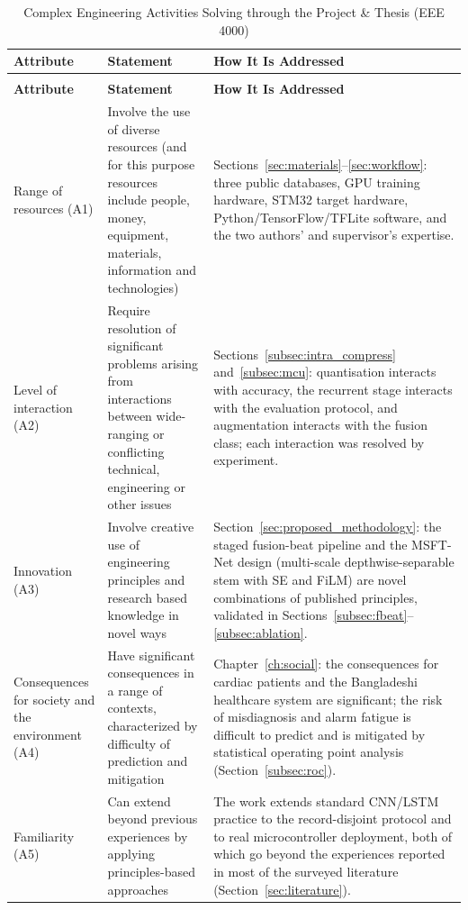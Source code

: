 \begin{longtable}{@{}>{\raggedright\arraybackslash}p{1.4in}>{\raggedright\arraybackslash}p{2.4in}>{\raggedright\arraybackslash}p{1.4in}@{}}
\caption{Complex Engineering Activities Solving through the Project \& Thesis (EEE 4000)}
\label{tab:cea_mapping} \\
\toprule
\textbf{Attribute} & \textbf{Statement} & \textbf{How It Is Addressed} \\
\midrule
\endfirsthead
\multicolumn{3}{@{}l}{\small\textit{Table \thetable\ continued from the previous page}} \\
\toprule
\textbf{Attribute} & \textbf{Statement} & \textbf{How It Is Addressed} \\
\midrule
\endhead
\bottomrule
\endfoot

Range of resources (A1) & Involve the use of diverse resources (and for this
purpose resources include people, money, equipment, materials, information
and technologies) &
Sections~\ref{sec:materials}--\ref{sec:workflow}: three public databases, GPU
training hardware, STM32 target hardware, Python/TensorFlow/TFLite
software, and the two authors' and supervisor's expertise. \\
\addlinespace

Level of interaction (A2) & Require resolution of significant problems
arising from interactions between wide-ranging or conflicting technical,
engineering or other issues
& Sections~\ref{subsec:intra_compress} and~\ref{subsec:mcu}: quantisation
interacts with accuracy, the
recurrent stage interacts with the evaluation protocol, and augmentation
interacts with the fusion class; each interaction was resolved by
experiment. \\
\addlinespace

Innovation (A3) & Involve creative use of engineering principles and
research based knowledge in novel ways
& Section~\ref{sec:proposed_methodology}: the staged fusion-beat pipeline
and the
MSFT-Net design (multi-scale depthwise-separable stem with SE and FiLM)
are novel combinations of published principles, validated in
Sections~\ref{subsec:fbeat}--\ref{subsec:ablation}. \\
\addlinespace

Consequences for society and the environment (A4) & Have significant
consequences in a range of contexts, characterized by difficulty of
prediction and mitigation
& Chapter~\ref{ch:social}: the consequences for cardiac patients and the
Bangladeshi
healthcare system are significant; the risk of misdiagnosis and alarm
fatigue is difficult to predict and is mitigated by statistical operating
point analysis (Section~\ref{subsec:roc}). \\
\addlinespace

Familiarity (A5) & Can extend beyond previous experiences by applying
principles-based approaches
& The work extends standard CNN/LSTM practice to the record-disjoint
protocol and to real microcontroller deployment, both of which go beyond
the experiences reported in most of the surveyed literature
(Section~\ref{sec:literature}). \\

\end{longtable}
